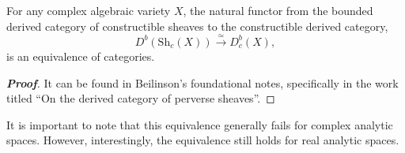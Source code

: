 \begin{theorem}
For any complex algebraic variety $X$, the natural functor from the bounded derived category of constructible sheaves to the constructible derived category, 
\[ D^b(\mathrm{Sh}_c(X)) \xrightarrow{\simeq} D_c^b(X), \]
is an equivalence of categories.
\end{theorem}

\begin{proof}[\textbf{Proof}]
It can be found in Beilinson's foundational notes, specifically in the work titled ``On the derived category of perverse sheaves''.
\end{proof}

\begin{remark}
    It is important to note that this equivalence generally fails for complex analytic spaces. However, interestingly, the equivalence still holds for real analytic spaces.
\end{remark}